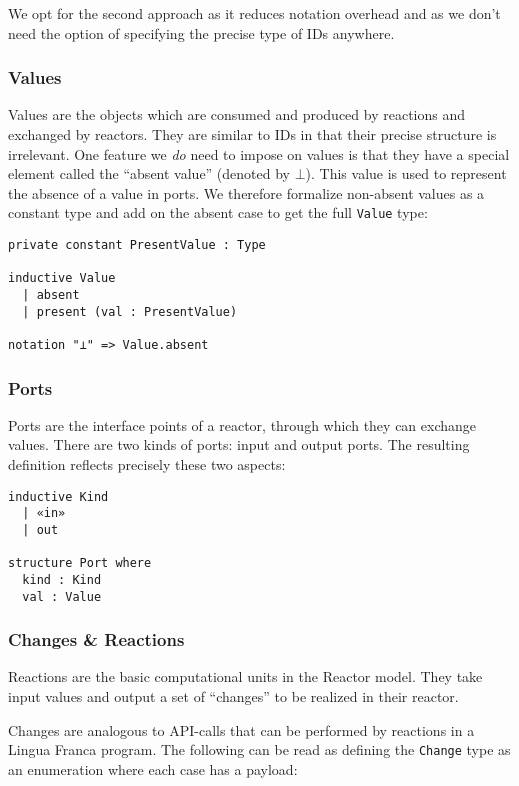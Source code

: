 We opt for the second approach as it reduces notation overhead and as we don't need the option of specifying the precise type of IDs anywhere.

\subsubsection{Values}

Values are the objects which are consumed and produced  by reactions and exchanged by reactors.
They are similar to IDs in that their precise structure is irrelevant.
One feature we \emph{do} need to impose on values is that they have a special element called the ``absent value'' (denoted by $\bot$).
This value is used to represent the absence of a value in ports.
We therefore formalize non-absent values as a constant type and add on the absent case to get the full \lstinline{Value} type:

\begin{lstlisting}
private constant PresentValue : Type

inductive Value 
  | absent 
  | present (val : PresentValue)

notation "⊥" => Value.absent
\end{lstlisting}

\subsubsection{Ports}

Ports are the interface points of a reactor, through which they can exchange values.
There are two kinds of ports: input and output ports.
The resulting definition reflects precisely these two aspects:

\begin{lstlisting}
inductive Kind
  | «in» 
  | out

structure Port where
  kind : Kind
  val : Value
\end{lstlisting}

\subsubsection{Changes \& Reactions}

Reactions are the basic computational units in the Reactor model. 
They take input values and output a set of ``changes'' to be realized in their reactor.

Changes are analogous to API-calls that can be performed by reactions in a Lingua Franca program.
The following can be read as defining the \lstinline{Change} type as an enumeration where each case has a payload:


